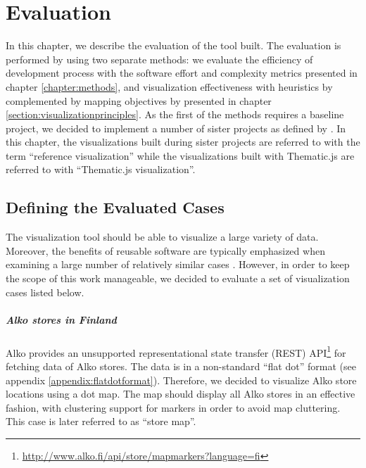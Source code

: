 
\chapter{Evaluation}
\label{chapter:evaluation}

In this chapter, we describe the evaluation of the tool built. The evaluation is performed by using two separate methods: we evaluate the efficiency of development process with the software effort and complexity metrics presented in chapter \ref{chapter:methods}, and visualization effectiveness with heuristics by \citet{zuk_heuristics_2006} complemented by mapping objectives by \citet{schlichtmann_visualization_2002} presented in chapter \ref{section:visualizationprinciples}. As the first of the methods requires a baseline project, we decided to implement a number of sister projects as defined by \citet{kitchenham_evaluating_1998}. In this chapter, the visualizations built during sister projects are referred to with the term ``reference visualization'' while the visualizations built with Thematic.js are referred to with ``Thematic.js visualization''. 

\section{Defining the Evaluated Cases}
\label{section:evaluatedcases}

The visualization tool should be able to visualize a large variety of data. Moreover, the benefits of reusable software are typically emphasized when examining a large number of relatively similar cases \citep{frakes_software_1996}. However, in order to keep the scope of this work manageable, we decided to evaluate a set of visualization cases listed below.

\paragraph{Alko stores in Finland}
Alko provides an unsupported representational state transfer (REST) API\footnote{\url{http://www.alko.fi/api/store/mapmarkers?language=fi}} for fetching data of Alko stores. The data is in a non-standard ``flat dot'' format (see appendix \ref{appendix:flatdotformat}). Therefore, we decided to visualize Alko store locations using a dot map. The map should display all Alko stores in an effective fashion, with clustering support for markers in order to avoid map cluttering. This case is later referred to as ``store map''.

